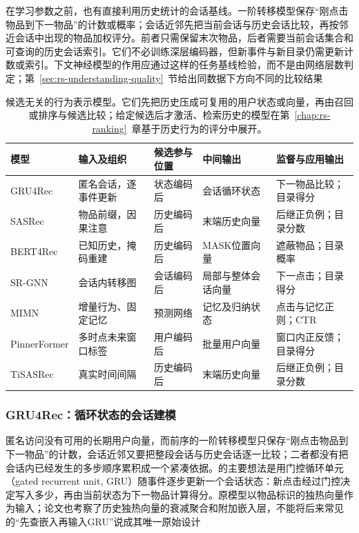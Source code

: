 在学习参数之前，也有直接利用历史统计的会话基线。一阶转移模型保存“刚点击物品到下一物品”的计数或概率；会话近邻先把当前会话与历史会话比较，再按邻近会话中出现的物品加权评分。前者只需保留末次物品，后者需要当前会话集合和可查询的历史会话索引。它们不必训练深层编码器，但新事件与新目录仍需更新计数或索引。下文神经模型的作用应通过这样的任务基线检验，而不是由网络层数判定；第~\ref{sec:rs-understanding-quality}~节给出同数据下方向不同的比较结果

\begin{table}[htbp]
  \centering
  \small
  \renewcommand{\arraystretch}{1.15}
  \begin{tabularx}{\linewidth}{@{}lXXXX@{}}
    \toprule
    模型 & 输入及组织 & 候选参与位置 & 中间输出 & 监督与应用输出 \\
    \midrule
    GRU4Rec & 匿名会话，逐事件更新 & 状态编码后 & 会话循环状态 & 下一物品比较；目录得分 \\
    SASRec & 物品前缀，因果注意 & 历史编码后 & 末端历史向量 & 后继正负例；目录分数 \\
    BERT4Rec & 已知历史，掩码重建 & 历史编码后 & MASK位置向量 & 遮蔽物品；目录概率 \\
    SR-GNN & 会话内转移图 & 会话编码后 & 局部与整体会话向量 & 下一点击；目录得分 \\
    MIMN & 增量行为、固定记忆 & 预测网络 & 记忆及归纳状态 & 点击与记忆正则；CTR \\
    PinnerFormer & 多时点未来窗口标签 & 用户编码后 & 批量用户向量 & 窗口内正反馈；目录得分 \\
    TiSASRec & 真实时间间隔 & 历史编码后 & 末端历史向量 & 后继正负例；目录分数 \\
    \bottomrule
  \end{tabularx}
  \caption{候选无关的行为表示模型。它们先把历史压成可复用的用户状态或向量，再由召回或排序与候选比较；给定候选后才激活、检索历史的模型在第~\ref{chap:rs-ranking}~章基于历史行为的评分中展开。}
  \label{tab:rs-behavior-models}
\end{table}

\subsubsection{GRU4Rec：循环状态的会话建模}
\label{sec:rs-gru4rec}

匿名访问没有可用的长期用户向量，而前序的一阶转移模型只保存“刚点击物品到下一物品”的计数，会话近邻又要把整段会话与历史会话逐一比较；二者都没有把会话内已经发生的多步顺序累积成一个紧凑依据。的主要想法是用门控循环单元（gated recurrent unit, GRU）随事件逐步更新一个会话状态：新点击经过门控决定写入多少，再由当前状态为下一物品计算得分。原模型以物品标识的独热向量作为输入；论文也考察了历史独热向量的衰减聚合和附加嵌入层，不能将后来常见的“先查嵌入再输入GRU”说成其唯一原始设计

